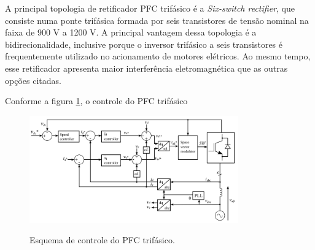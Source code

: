 A principal topologia de retificador PFC trifásico é a \textit{Six-switch rectifier}, que consiste numa ponte trifásica formada por seis transistores de tensão nominal na faixa de 900 V a 1200 V. A principal vantagem dessa topologia é a bidirecionalidade, inclusive porque o inversor trifásico a seis transistores é frequentemente utilizado no acionamento de motores elétricos. Ao mesmo tempo, esse retificador apresenta maior interferência eletromagnética que as outras opções citadas.

Conforme a figura \ref{fig:controlepfc3ph}, o controle do PFC trifásico

\begin{figure}
	\centering
	\caption{Esquema de controle do PFC trifásico.}
	\includegraphics[width=0.8\textwidth]{./Figuras/controlepfc3ph.png}
	\label{fig:controlepfc3ph}
\end{figure}